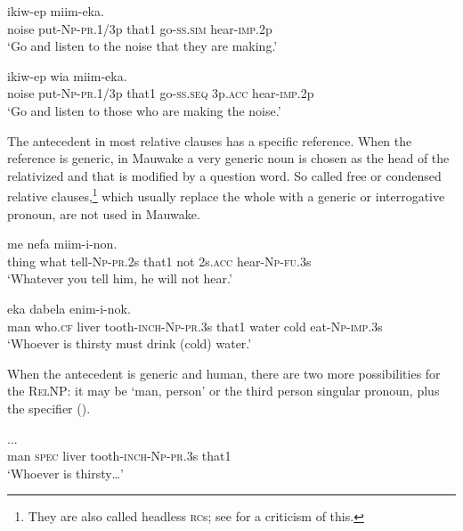 \ea%
\label{ex:8:x1557}
  ikiw-ep  miim-eka. \\
noise  put-\textsc{Np}-\textsc{pr}.1/3p that1 go-\textsc{ss}.\textsc{sim} hear-\textsc{imp}.2p\\
\glt`Go and listen to the noise that they are making.'
\z


\ea%
\label{ex:8:x1558}
  ikiw-ep  wia  miim-eka.\\
noise  put-\textsc{Np}-\textsc{pr}.1/3p that1 go-\textsc{ss}.\textsc{seq} 3p.\textsc{acc} hear-\textsc{imp}.2p\\
\glt`Go and listen to those who are making the noise.'
\z


The antecedent in most relative clauses has a specific reference. When the reference is generic, in Mauwake a very generic noun is chosen as the head of the relativized  and that is modified by a question word. So called free \citep[213]{Andrews2007b} or condensed \citep[359]{Dixon2010b} relative clauses,\footnote{They are also called headless \textsc{rc}s; see \citet[317,360]{Dixon2010b} for a criticism of this.} which usually replace the whole  with a generic or interrogative pronoun, are not used in Mauwake. 

\ea%
\label{ex:8:x1562}
  me  nefa  miim-i-non.\\
thing  what  tell-\textsc{Np}-\textsc{pr}.2s that1 not 2s.\textsc{acc} hear-\textsc{Np}-\textsc{fu}.3s\\
\glt`Whatever you tell him, he will not hear.'
\z


\ea%
\label{ex:8:x1563}
  eka  dabela enim-i-nok.\\
man  who.\textsc{cf} liver  tooth-\textsc{inch}-\textsc{Np}-\textsc{pr}.3s  that1  water  cold eat-\textsc{Np}-\textsc{imp}.3s\\
\glt`Whoever is thirsty must drink (cold) water.'
\z


When the antecedent is generic and human, there are two more possibilities for the \textsc{RelNP}: it may be  `man, person' or the third person singular pronoun, plus the specifier  (). 

\ea%
\label{ex:8:x1564}
  ... \\
man  \textsc{spec} liver  tooth-\textsc{inch}-\textsc{Np}-\textsc{pr}.3s  that1\\
\glt`Whoever is thirsty{\dots}'
\z


